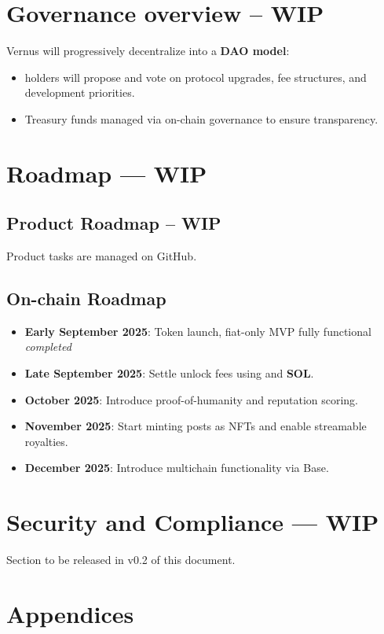 \documentclass[10pt]{article}
\begin{document}
  \section{Governance overview -- WIP}
    Vernus will progressively decentralize into a \textbf{DAO model}:
    \begin{itemize}[leftmargin=*]
      \item \textbf{\tokenticker{}} holders will propose and vote on protocol upgrades, fee structures, and development priorities.
      \item Treasury funds managed via on-chain governance to ensure transparency.
    \end{itemize}

  \section{Roadmap --- WIP}
    \subsection{Product Roadmap -- WIP}
      Product tasks are managed on GitHub.

    \subsection{On-chain Roadmap}
      \begin{itemize}[leftmargin=*]
        \item \textbf{Early September 2025}: Token launch, fiat-only MVP fully functional \textit{completed}
        \item \textbf{Late September 2025}: Settle unlock fees using \textbf{\tokenticker{}} and \textbf{SOL}.
        \item \textbf{October 2025}: Introduce proof-of-humanity and reputation scoring.
        \item \textbf{November 2025}: Start minting posts as NFTs and enable streamable royalties.
        \item \textbf{December 2025}: Introduce multichain functionality via Base.
      \end{itemize}

  \section{Security and Compliance --- WIP}
    Section to be released in v0.2 of this document.

  \section{Appendices}
\end{document}
